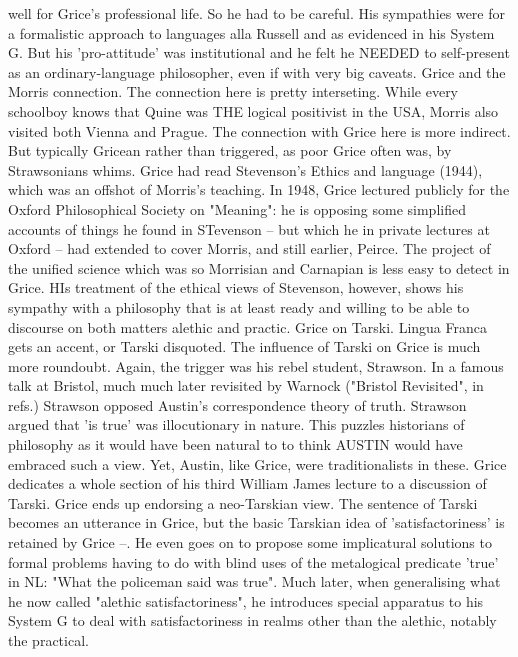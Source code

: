 \documentclass[10pt,titlepage]{book}
\begin{document}
well for  Grice's  professional life. So he had to be careful. His sympathies 
were  for a  formalistic approach to languages alla Russell and as evidenced 
in  his System  G. But his 'pro-attitude' was institutional and he felt he  
NEEDED to  self-present as an ordinary-language philosopher, even if with  
very big  caveats. 
Grice  and the Morris connection. The connection here is pretty 
interseting. While  every schoolboy knows that Quine was THE logical positivist in the 
USA, Morris  also visited both Vienna and Prague. The connection with Grice 
here is more  indirect. But typically Gricean rather than triggered, as poor 
Grice often was,  by Strawsonians whims. Grice had read Stevenson's Ethics 
and language (1944),  which was an offshot of Morris's teaching. In 1948, 
Grice lectured publicly for  the Oxford Philosophical Society on "Meaning": he 
is opposing some simplified  accounts of things he found in STevenson -- 
but which he in private lectures at  Oxford --  had extended to cover Morris, 
and still earlier, Peirce. The  project of the unified science which was so 
Morrisian and Carnapian is less easy  to detect in Grice. HIs treatment of 
the ethical views of Stevenson, however,  shows his sympathy with a 
philosophy that is at least ready and willing to be  able to discourse on both 
matters alethic and practic. 
Grice  on Tarski. Lingua Franca gets an accent, or Tarski disquoted. The 
influence of  Tarski on Grice is much more roundoubt. Again, the trigger was 
his rebel  student, Strawson. In a famous talk at Bristol, much much later 
revisited  by Warnock ("Bristol Revisited", in refs.) Strawson opposed 
Austin's  correspondence theory of truth. Strawson argued that 'is true' was  
illocutionary in nature. This puzzles historians of philosophy as it would have  
been natural to to think AUSTIN would have embraced such a view. Yet,  
Austin, like Grice, were traditionalists in these. Grice dedicates a whole  
section of his third William James lecture to a discussion of Tarski. Grice ends  
up endorsing a neo-Tarskian view. The sentence of Tarski becomes an 
utterance in  Grice, but the basic Tarskian idea of 'satisfactoriness' is retained 
by Grice  --. He even goes on to propose some implicatural solutions to 
formal problems  having to do with blind uses of the metalogical predicate 
'true' in NL:  "What the policeman said was true". Much later, when generalising 
what he  now called "alethic satisfactoriness", he introduces special 
apparatus to his  System G to deal with satisfactoriness in realms other than the 
alethic,  notably the practical.  
\end{document}
